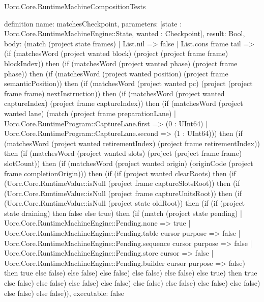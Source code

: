 \begin{lexlean}{Uorc.Core.RuntimeMachineCompositionTests}
\begin{semanticmodule}
definition{
  name: matchesCheckpoint,
  parameters: [state : Uorc.Core.RuntimeMachineEngine::State, wanted : Checkpoint],
  result: Bool,
  body: (match (project state frames)
    | List.nil => false
    | List.cons frame tail => (if (matchesWord (project wanted block) (project (project frame frame) blockIndex)) then (if (matchesWord (project wanted phase) (project frame phase)) then (if (matchesWord (project wanted position) (project frame semanticPosition)) then (if (matchesWord (project wanted pc) (project (project frame frame) nextInstruction)) then (if (matchesWord (project wanted captureIndex) (project frame captureIndex)) then (if (matchesWord (project wanted lane) (match (project frame preparationLane)
      | Uorc.Core.RuntimeProgram::CaptureLane.first => (0 : UInt64)
      | Uorc.Core.RuntimeProgram::CaptureLane.second => (1 : UInt64))) then (if (matchesWord (project wanted retirementIndex) (project frame retirementIndex)) then (if (matchesWord (project wanted slots) (project (project frame frame) slotCount)) then (if (matchesWord (project wanted origin) (originCode (project frame completionOrigin))) then (if (if (project wanted clearRoots) then (if (Uorc.Core.RuntimeValue::isNull (project frame captureSlotsRoot)) then (if (Uorc.Core.RuntimeValue::isNull (project frame captureUnitsRoot)) then (if (Uorc.Core.RuntimeValue::isNull (project state oldRoot)) then (if (if (project state draining) then false else true) then (if (match (project state pending)
      | Uorc.Core.RuntimeMachineEngine::Pending.none => true
      | Uorc.Core.RuntimeMachineEngine::Pending.table cursor purpose => false
      | Uorc.Core.RuntimeMachineEngine::Pending.sequence cursor purpose => false
      | Uorc.Core.RuntimeMachineEngine::Pending.store cursor => false
      | Uorc.Core.RuntimeMachineEngine::Pending.builder cursor purpose => false) then true else false) else false) else false) else false) else false) else true) then true else false) else false) else false) else false) else false) else false) else false) else false) else false) else false)),
  executable: false
}


\end{semanticmodule}
\end{lexlean}
